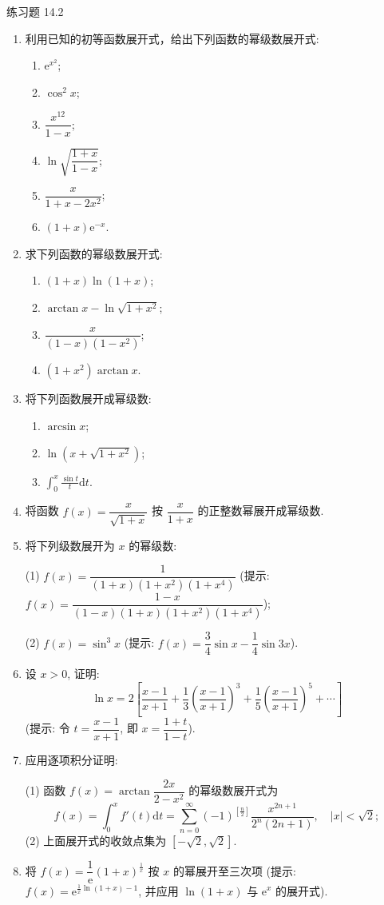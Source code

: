 \begin{exblock}{练习题 14.2}
\begin{enumerate}
  \item 利用已知的初等函数展开式，给出下列函数的幂级数展开式:
  \begin{enumerate}
    \item $\mathrm{e}^{x^{2}}$;
    \item $\cos^{2}x$;
    \item $\dfrac{x^{12}}{1-x}$;
    \item $\ln\sqrt{\dfrac{1+x}{1-x}}$;
    \item $\dfrac{x}{1+x-2x^{2}}$;
    \item $(1+x)\mathrm{e}^{-x}$.
  \end{enumerate}
  \item 求下列函数的幂级数展开式:
  \begin{enumerate}
    \item $(1+x)\ln(1+x)$;
    \item $\arctan x-\ln\sqrt{1+x^{2}}$;
    \item $\dfrac{x}{(1-x)(1-x^{2})}$;
    \item $(1+x^{2})\arctan x$.
  \end{enumerate}
  \item 将下列函数展开成幂级数:
  \begin{enumerate}
    \item $\arcsin x$;
    \item $\ln(x+\sqrt{1+x^{2}})$;
    \item $\displaystyle\int_{0}^{x}\frac{\sin t}{t}\mathrm{d}t$.
  \end{enumerate}
  \item 将函数 $f(x)=\dfrac{x}{\sqrt{1+x}}$ 按 $\dfrac{x}{1+x}$ 的正整数幂展开成幂级数.
  \item 将下列级数展开为 $x$ 的幂级数:

  (1) $f(x)=\dfrac{1}{(1+x)(1+x^{2})(1+x^{4})}$ (提示: $f(x)=\dfrac{1-x}{(1-x)(1+x)(1+x^{2})(1+x^{4})}$);

  (2) $f(x)=\sin^{3}x$ (提示: $f(x)=\dfrac{3}{4}\sin x-\dfrac{1}{4}\sin3x$).
  \item 设 $x>0$, 证明:
  \[
    \ln x=2\left[\frac{x-1}{x+1}+\frac{1}{3}\left(\frac{x-1}{x+1}\right)^{3}+\frac{1}{5}\left(\frac{x-1}{x+1}\right)^{5}+\cdots\right]
\]
  (提示: 令 $t=\dfrac{x-1}{x+1}$, 即 $x=\dfrac{1+t}{1-t}$).
  \item 应用逐项积分证明:

  (1) 函数 $f(x)=\arctan\dfrac{2x}{2-x^{2}}$ 的幂级数展开式为
  \[
    f(x)=\int_{0}^{x}f'(t)\mathrm{d}t=\sum_{n=0}^{\infty}(-1)^{[\frac{n}{2}]}\frac{x^{2n+1}}{2^{n}(2n+1)},\quad|x|<\sqrt{2};
\]
  (2) 上面展开式的收敛点集为 $[-\sqrt{2},\sqrt{2}]$.
  \item 将 $f(x)=\dfrac{1}{\mathrm{e}}(1+x)^{\frac{1}{x}}$ 按 $x$ 的幂展开至三次项 (提示: $f(x)=\mathrm{e}^{\frac{1}{x}\ln(1+x)-1}$, 并应用 $\ln(1+x)$ 与 $\mathrm{e}^{x}$ 的展开式).
\end{enumerate}
\end{exblock}

